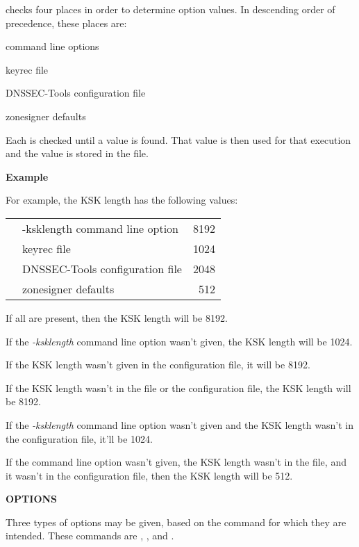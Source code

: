  checks four places in order to determine option values.  
In descending order of precedence, these places are:

\begin{description}
\item command line options
\item keyrec file
\item DNSSEC-Tools configuration file
\item zonesigner defaults
\end{description}

Each is checked until a value is found.  That value is then used for that
 execution and the value is stored in the  file.

{\bf Example}

For example, the KSK length has the following values:

\begin{table}[ht]
\begin{tabular}{clr}
& -ksklength command line option  & 8192 \\
& keyrec file                     & 1024 \\
& DNSSEC-Tools configuration file & 2048 \\
& zonesigner defaults             & 512 \\
\end{tabular}
\end{table}

If all are present, then the KSK length will be 8192.

If the {\it -ksklength} command line option wasn't given, the KSK length
will be 1024.

If the KSK length wasn't given in the configuration file, it will be 8192.

If the KSK length wasn't in the  file or the configuration
file, the KSK length will be 8192.

If the {\it -ksklength} command line option wasn't given and the KSK length
wasn't in the configuration file, it'll be 1024.

If the command line option wasn't given, the KSK length wasn't in the
 file, and it wasn't in the configuration file, then the KSK
length will be 512.

{\bf OPTIONS}

Three types of options may be given, based on the command for which they are
intended.  These commands are  , , and
.

